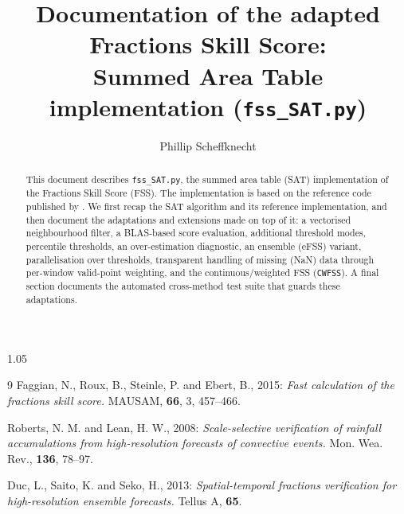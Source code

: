 \documentclass[a4paper,12pt]{article}
\title{Documentation of the adapted Fractions Skill Score:\\
       Summed Area Table implementation (\texttt{fss\_SAT.py})}
\author{Phillip Scheffknecht}
\begin{document}
\begin{spacing}{1.05}
\maketitle

\begin{abstract}
This document describes \texttt{fss\_SAT.py}, the summed area table (SAT)
implementation of the Fractions Skill Score (FSS). The implementation is based
on the reference code published by \citet{faggian2015}. We first recap the SAT
algorithm and its reference implementation, and then document the adaptations
and extensions made on top of it: a vectorised neighbourhood filter, a
BLAS-based score evaluation, additional threshold modes, percentile thresholds,
an over-estimation diagnostic, an ensemble (eFSS) variant, parallelisation over
thresholds, transparent handling of missing (NaN) data through per-window
valid-point weighting, and the continuous/weighted FSS (\texttt{CWFSS}). A final
section documents the automated cross-method test suite that guards these
adaptations.\\
\end{abstract}

\tableofcontents
\newpage









\begin{thebibliography}{9}
Faggian, N., Roux, B., Steinle, P. and Ebert, B., 2015:
\textit{Fast calculation of the fractions skill score.}
MAUSAM, \textbf{66}, 3, 457--466.

Roberts, N. M. and Lean, H. W., 2008:
\textit{Scale-selective verification of rainfall accumulations from
high-resolution forecasts of convective events.}
Mon. Wea. Rev., \textbf{136}, 78--97.

Duc, L., Saito, K. and Seko, H., 2013:
\textit{Spatial-temporal fractions verification for high-resolution ensemble
forecasts.} Tellus A, \textbf{65}.
\end{thebibliography}

\end{spacing}
\end{document}

